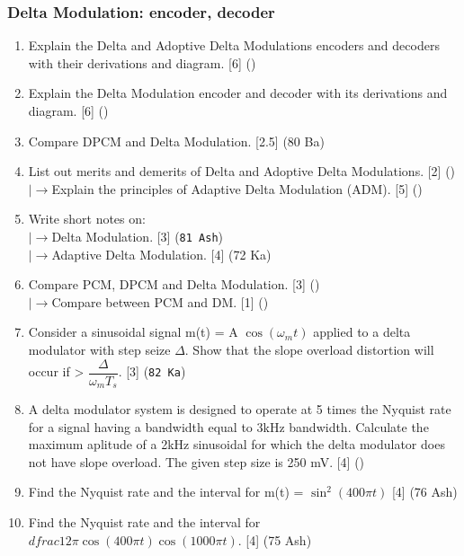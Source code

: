\documentclass[12pt]{article}
\newcommand{\lb}{\\$\left|\rightarrow\right.$}
\begin{document}
    \subsubsection{Delta Modulation: encoder, decoder}
      \begin{enumerate}
        \item Explain the Delta and Adoptive Delta Modulations encoders and decoders with their derivations and diagram. \hfill [6] ()

        \item Explain the Delta Modulation encoder and decoder with its derivations and diagram. \hfill [6] ()
        
        \item Compare DPCM and Delta Modulation. [2.5] (80 Ba)

        \item List out merits and demerits of Delta and Adoptive Delta Modulations. \hfill [2] ()
        \lb Explain the principles of Adaptive Delta Modulation (ADM). \hfill [5] ()
        
        \item Write short notes on:
          \lb Delta Modulation. \hfill [3] (\texttt{81 Ash})
          \lb Adaptive Delta Modulation. \hfill [4] (72 Ka)

        \item Compare PCM, DPCM and Delta Modulation. \hfill [3] ()
        \lb Compare between PCM and DM. \hfill [1] ()

        \item Consider a sinusoidal signal m(t) = A $\cos(\omega_m t)$ applied to a delta modulator with step seize $\Delta$. Show that the slope overload distortion will occur if > $\dfrac{\Delta}{\omega_m T_s}$. \hfill [3] (\texttt{82 Ka})
        \item A delta modulator system is designed to operate at 5 times the Nyquist rate for a signal having a bandwidth equal to 3kHz bandwidth. Calculate the maximum aplitude of a 2kHz sinusoidal for which the delta modulator does not have slope overload. The given step size is 250 mV. \hfill [4] ()
        
        \item Find the Nyquist rate and the interval for m(t) = $\sin^2(400\pi t)$ \hfill [4] (76 Ash)
        
        \item Find the Nyquist rate and the interval for $dfrac{1}{2} \pi \cos(400\pi t) \cos(1000\pi t)$. \hfill [4] (75 Ash)
        

\end{enumerate}
\end{document}
